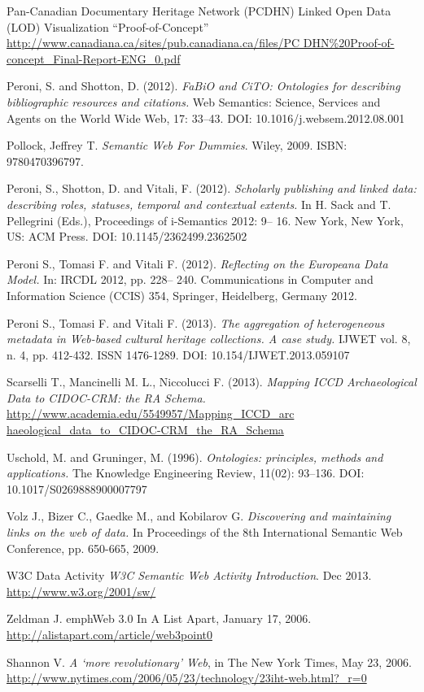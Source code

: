 \begin{thebibliography}{90}
 Pan-Canadian Documentary Heritage Network (PCDHN) Linked Open Data (LOD) Visualization ``Proof-of-Concept''\\
\url{http://www.canadiana.ca/sites/pub.canadiana.ca/files/PC DHN\%20Proof-of-concept_Final-Report-ENG_0.pdf}

 Peroni, S. and Shotton, D. (2012). \emph{FaBiO and CiTO: Ontologies for describing bibliographic resources and citations.} Web Semantics: Science, Services and Agents on the World Wide Web, 17: 33–43. DOI: 10.1016/j.websem.2012.08.001

 Pollock, Jeffrey T. \emph{Semantic Web For Dummies}. Wiley, 2009. ISBN: 9780470396797.

 Peroni, S., Shotton, D. and Vitali, F. (2012). \emph{Scholarly publishing and linked data: describing roles, statuses, temporal and contextual extents.} In H. Sack and T. Pellegrini (Eds.), Proceedings of i-Semantics 2012: 9– 16. New York, New York, US: ACM Press. DOI: 10.1145/2362499.2362502

 Peroni S., Tomasi F. and Vitali F. (2012). \emph{Reflecting on the Europeana Data Model.} In: IRCDL 2012, pp. 228– 240. Communications in Computer and Information Science (CCIS) 354, Springer, Heidelberg, Germany 2012.

 Peroni S., Tomasi F. and Vitali F. (2013). \emph{The aggregation of heterogeneous metadata in Web-based cultural heritage collections. A case study.} IJWET vol. 8, n. 4, pp. 412-432. ISSN 1476-1289. DOI: 10.154/IJWET.2013.059107

 Scarselli T., Mancinelli M. L., Niccolucci F. (2013). \emph{Mapping ICCD Archaeological Data to CIDOC-CRM: the RA Schema.}\\
\url{http://www.academia.edu/5549957/Mapping_ICCD_arc haeological_data_to_CIDOC-CRM_the_RA_Schema}

 Uschold, M. and Gruninger, M. (1996). \emph{Ontologies: principles, methods and applications.} The Knowledge Engineering Review, 11(02): 93–136. DOI: 10.1017/S0269888900007797

 Volz J., Bizer C., Gaedke M., and Kobilarov G. \emph{Discovering and maintaining links on the web of data.} In Proceedings of the 8th International Semantic Web Conference, pp. 650-665, 2009.

 W3C Data Activity \emph{W3C Semantic Web Activity Introduction}. Dec 2013.\\
\url{http://www.w3.org/2001/sw/}

 Zeldman J. emph{Web 3.0} In A List Apart, January 17, 2006.\\
\url{http://alistapart.com/article/web3point0}

 Shannon V. \emph{A `more revolutionary' Web}, in The New York Times, May 23, 2006.\\
\url{http://www.nytimes.com/2006/05/23/technology/23iht-web.html?_r=0}

\end{thebibliography}